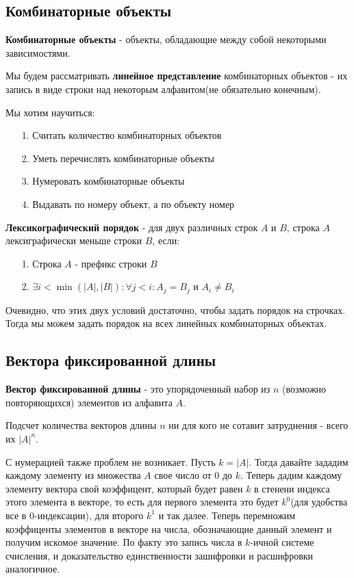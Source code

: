 
\subsection{Комбинаторные объекты}
\textbf{Комбинаторные объекты} - объекты, обладающие между собой некоторыми зависимостями.

Мы будем рассматривать \textbf{линейное представление} комбинаторных объектов - их запись в виде строки над некоторым алфавитом(не обязательно конечным).

Мы хотим научиться:
\begin{enumerate}
\item[1.] Считать количество комбинаторных объектов
\item[2.] Уметь перечислять комбинаторные объекты
\item[3.] Нумеровать комбинаторные объекты 
\item[4.] Выдавать по номеру объект, а по объекту номер
\end{enumerate}
\textbf{Лексикографический порядок} - для двух различных строк $A$ и $B$, строка $A$ лексиграфически меньше строки $B$, если:
\begin{enumerate}
    \item[1.] Строка $A$ - префикс строки $B$
    \item[2.] $\exists i < \min(|A|, |B|): \forall j < i : A_j = B_j$ и $A_i \neq B_i$ 
\end{enumerate}
Очевидно, что этих двух условий достаточно, чтобы задать порядок на строчках. Тогда мы можем задать порядок на всех линейных комбинаторных объектах.

\subsection{Вектора фиксированной длины}
\textbf{Вектор фиксированной длины} - это упорядоченный набор из $n$ (возможно повторяющихся) элементов из алфавита $A$. 

Подсчет количества векторов длины $n$ ни для кого не сотавит затруднения - всего их $|A|^n$.

С нумерацией также проблем не возникает. Пусть $k = |A|$. Тогда давайте зададим каждому элементу из множества $A$ свое число от 0 до $k$. Теперь дадим каждому элементу вектора свой коэффицент, который будет равен $k$ в стенени индекса этого элемента в векторе, то есть для первого элемента это будет $k^0$(для удобства все в 0-индексации), для второго $k^1$ и так далее. Теперь перемножим коэффиценты элементов в векторе на числа, обозначающие данный элемент и получим искомое значение. По факту это запись числа в $k$-ичной системе счисления, и доказательство единственности зашифровки и расшифровки аналогичное.

